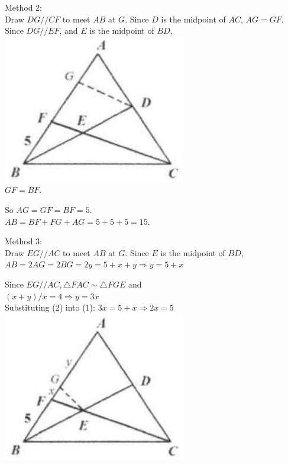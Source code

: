 \documentclass{article}
\begin{document}
Method 2:\\
Draw \(D G / / C F\) to meet \(A B\) at \(G\). Since \(D\) is the midpoint of \(A C\), \(A G=G F\).\\
Since \(D G / / E F\), and \(E\) is the midpoint of \(B D\),\\
\centering
\includegraphics[width=\textwidth]{images/103(2).jpg}\\
\(G F=B F\).

So \(A G=G F=B F=5\).\\
\(A B=B F+F G+A G=5+5+5=15\).

Method 3:\\
Draw \(E G / / A C\) to meet \(A B\) at \(G\). Since \(E\) is the midpoint of \(B D\),\\
\(A B=2 A G=2 B G=2 y=5+x+y \Rightarrow y=5+x\)

Since \(E G / / A C, \triangle F A C \sim \triangle F G E\) and\\
\((x+y) / x=4 \Rightarrow y=3 x\)\\
Substituting (2) into (1): \(3 x=5+x \Rightarrow 2 x=5\)\\
\centering
\includegraphics[width=\textwidth]{images/103(6).jpg}
\end{document}
